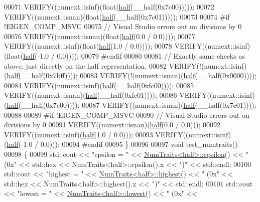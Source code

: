 \begin{DoxyCode}
00071   VERIFY((numext::isinf)(\textcolor{keywordtype}{float}(\hyperlink{struct_eigen_1_1half}{half}(\_\_half(0x7c00)))));
00072   VERIFY((numext::isnan)(\textcolor{keywordtype}{float}(\hyperlink{struct_eigen_1_1half}{half}(\_\_half(0x7c01)))));
00073 
00074 \textcolor{preprocessor}{#if !EIGEN\_COMP\_MSVC}
00075   \textcolor{comment}{// Visual Studio errors out on divisions by 0}
00076   VERIFY((numext::isnan)(\textcolor{keywordtype}{float}(\hyperlink{struct_eigen_1_1half}{half}(0.0 / 0.0))));
00077   VERIFY((numext::isinf)(\textcolor{keywordtype}{float}(\hyperlink{struct_eigen_1_1half}{half}(1.0 / 0.0))));
00078   VERIFY((numext::isinf)(\textcolor{keywordtype}{float}(\hyperlink{struct_eigen_1_1half}{half}(-1.0 / 0.0))));
00079 \textcolor{preprocessor}{#endif}
00080 
00081   \textcolor{comment}{// Exactly same checks as above, just directly on the half representation.}
00082   VERIFY(!(numext::isinf)(\hyperlink{struct_eigen_1_1half}{half}(\_\_half(0x7bff))));
00083   VERIFY(!(numext::isnan)(\hyperlink{struct_eigen_1_1half}{half}(\_\_half(0x0000))));
00084   VERIFY((numext::isinf)(\hyperlink{struct_eigen_1_1half}{half}(\_\_half(0xfc00))));
00085   VERIFY((numext::isnan)(\hyperlink{struct_eigen_1_1half}{half}(\_\_half(0xfc01))));
00086   VERIFY((numext::isinf)(\hyperlink{struct_eigen_1_1half}{half}(\_\_half(0x7c00))));
00087   VERIFY((numext::isnan)(\hyperlink{struct_eigen_1_1half}{half}(\_\_half(0x7c01))));
00088 
00089 \textcolor{preprocessor}{#if !EIGEN\_COMP\_MSVC}
00090   \textcolor{comment}{// Visual Studio errors out on divisions by 0}
00091   VERIFY((numext::isnan)(\hyperlink{struct_eigen_1_1half}{half}(0.0 / 0.0)));
00092   VERIFY((numext::isinf)(\hyperlink{struct_eigen_1_1half}{half}(1.0 / 0.0)));
00093   VERIFY((numext::isinf)(\hyperlink{struct_eigen_1_1half}{half}(-1.0 / 0.0)));
00094 \textcolor{preprocessor}{#endif}
00095 \}
00096 
00097 \textcolor{keywordtype}{void} test\_numtraits()
00098 \{
00099   std::cout << \textcolor{stringliteral}{"epsilon       = "} << \hyperlink{group___core___module_struct_eigen_1_1_num_traits}{NumTraits<half>::epsilon}() << \textcolor{stringliteral}{"  (0x"} << 
      std::hex << NumTraits<half>::epsilon().x << \textcolor{stringliteral}{")"} << std::endl;
00100   std::cout << \textcolor{stringliteral}{"highest       = "} << \hyperlink{group___core___module_struct_eigen_1_1_num_traits}{NumTraits<half>::highest}() << \textcolor{stringliteral}{"  (0x"} << 
      std::hex << NumTraits<half>::highest().x << \textcolor{stringliteral}{")"} << std::endl;
00101   std::cout << \textcolor{stringliteral}{"lowest        = "} << \hyperlink{group___core___module_struct_eigen_1_1_num_traits}{NumTraits<half>::lowest}() << \textcolor{stringliteral}{"  (0x"} << 

\end{DoxyCode}
